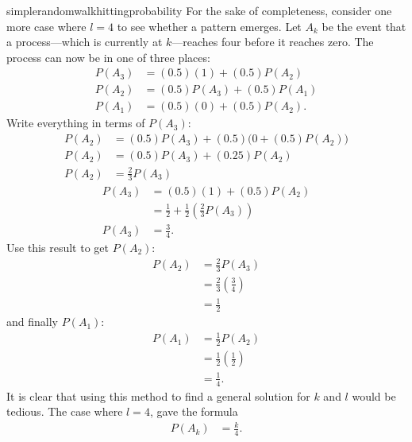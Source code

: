 \begin{answer}{simplerandomwalkhittingprobability}
For the sake of completeness, consider one more case where $l=4$ to see whether a pattern emerges.
Let $A_k$ be the event that a process---which is currently at $k$---reaches four before it reaches zero.
The process can now be in one of three places:
\begin{align*}
P(A_3) &= (0.5)(1) + (0.5)P(A_2)  \\
P(A_2) &= (0.5)P(A_3) + (0.5)P(A_1) \\
P(A_1) &= (0.5)(0) + (0.5)P(A_2)
\text{.}
\end{align*}
Write everything in terms of $P(A_3)$:
\begin{align*}
P(A_2) &= (0.5)P(A_3) + (0.5)\Big(0 + (0.5) P(A_2) \Big)  \\
P(A_2) &= (0.5) P(A_3)  + (0.25) P(A_2)  \\
P(A_2) &= \frac{2}{3} P(A_3)
\end{align*}
\begin{align*}
P(A_3) &= (0.5)(1) + (0.5) P(A_2)   \\
       &= \frac{1}{2} + \frac{1}{2}\left(\frac{2}{3}P(A_3)\right)  \\
            P(A_3) &= \frac{3}{4}
\text{.}
\end{align*}
Use this result to get $P(A_2)$:
\begin{align*}
P(A_2) &= \frac{2}{3} P(A_3)  \\
       &= \frac{2}{3}\left(\frac{3}{4}\right) \\
       &= \frac{1}{2}
\end{align*}
and finally $P(A_1)$:
\begin{align*}
P(A_1) &= \frac{1}{2} P(A_2)        \\
       &= \frac{1}{2}\left( \frac{1}{2} \right) \\
       &= \frac{1}{4}
\text{.}
\end{align*}
It is clear that using this method to find a general solution for $k$ and $l$ would be tedious.
The case where $l=4$, gave the formula
\begin{align*}
P(A_k) &= \frac{k}{4}
\text{.}
\end{align*}


\end{answer}

